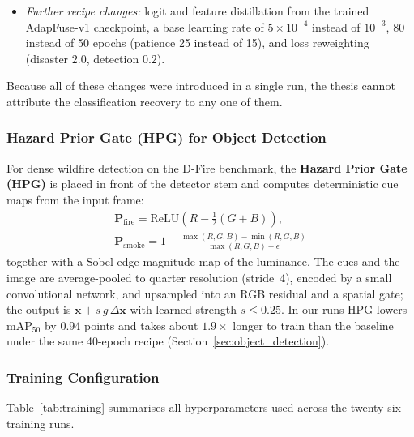 \documentclass[journal]{IEEEtran}
\begin{document}
\begin{enumerate}
\begin{itemize}
        \item \textit{Further recipe changes:} logit and feature distillation from the trained AdapFuse-v1 checkpoint, a base learning rate of $5\times10^{-4}$ instead of $10^{-3}$, 80 instead of 50 epochs (patience 25 instead of 15), and loss reweighting (disaster $2.0$, detection $0.2$).
    \end{itemize}
    Because all of these changes were introduced in a single run, the thesis cannot attribute the classification recovery to any one of them.
\end{enumerate}

\subsubsection{Hazard Prior Gate (HPG) for Object Detection}
\label{sec:hpg}

For dense wildfire detection on the D-Fire benchmark, the \textbf{Hazard Prior Gate (HPG)} is placed in front of the detector stem and computes deterministic cue maps from the input frame:
\begin{equation}
\begin{gathered}
    \mathbf{P}_{\text{fire}} = \text{ReLU}\!\left(R - \tfrac{1}{2}(G + B)\right), \\ \mathbf{P}_{\text{smoke}} = 1 - \frac{\max(R,G,B) - \min(R,G,B)}{\max(R,G,B) + \epsilon}
\end{gathered}
\end{equation}
together with a Sobel edge-magnitude map of the luminance. The cues and the image are average-pooled to quarter resolution (stride~4), encoded by a small convolutional network, and upsampled into an RGB residual and a spatial gate; the output is $\mathbf{x} + s\,g\,\Delta\mathbf{x}$ with learned strength $s \leq 0.25$. In our runs HPG lowers $\mathrm{mAP}_{50}$ by 0.94 points and takes about $1.9\times$ longer to train than the baseline under the same 40-epoch recipe (Section~\ref{sec:object_detection}).

\subsubsection{Training Configuration}

Table~\ref{tab:training} summarises all hyperparameters used across the twenty-six training runs.
\end{document}
